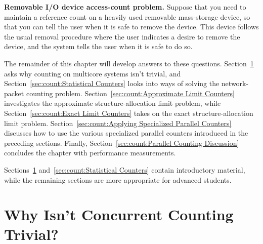 \QuickQuiz{}
	{ \bfseries Removable I/O device access-count problem. }
	Suppose that you need to maintain a reference count on a
	heavily used removable mass-storage device, so that you
	can tell the user when it is safe to remove the device.
	This device follows the usual removal procedure where
	the user indicates a desire to remove the device, and
	the system tells the user when it is safe to do so.
 \QuickQuizEnd

\edef\QQIOcnt{Quick Quiz \thechapter.\thequickquizctr}

The remainder of this chapter will develop answers to these questions.
Section~\ref{sec:count:Why Isn't Concurrent Counting Trivial?}
asks why counting on multicore systems isn't trivial, and
Section~\ref{sec:count:Statistical Counters}
looks into ways of solving the network-packet counting problem.
Section~\ref{sec:count:Approximate Limit Counters}
investigates the approximate structure-allocation limit problem, while
Section~\ref{sec:count:Exact Limit Counters}
takes on the exact structure-allocation limit problem.
Section~\ref{sec:count:Applying Specialized Parallel Counters}
discusses how to use the various specialized parallel counters
introduced in the preceding sections.
Finally, Section~\ref{sec:count:Parallel Counting Discussion}
concludes the chapter with performance measurements.

Sections~\ref{sec:count:Why Isn't Concurrent Counting Trivial?}
and~\ref{sec:count:Statistical Counters}
contain introductory material, while the remaining sections
are more appropriate for advanced students.

\section{Why Isn't Concurrent Counting Trivial?}
\label{sec:count:Why Isn't Concurrent Counting Trivial?}

